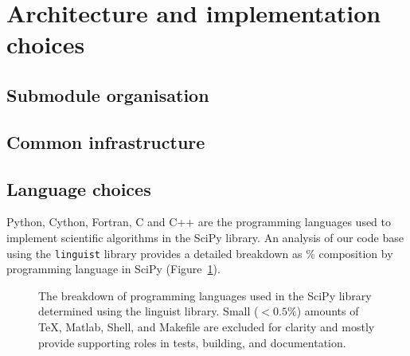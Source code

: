 \documentclass[fleqn,10pt]{wlscirep}
\begin{document}
\section*{Architecture and implementation choices}

\subsection*{Submodule organisation}


\subsection*{Common infrastructure}

\subsection*{Language choices}
Python, Cython, Fortran, C and C++ are the programming languages
used to implement scientific algorithms in the SciPy library. An analysis
of our code base using the \texttt{linguist} library provides a detailed
breakdown as \% composition by programming language in SciPy
(Figure~\ref{fig:linguist}).

    \begin{figure}[H]
        \centering

        \caption{The breakdown of programming languages used in the
	         SciPy library determined using the linguist library.
		 Small ($<0.5 \%$) amounts of TeX, Matlab, Shell,
		 and Makefile are excluded for clarity and mostly
		 provide supporting roles in tests, building, and
		 documentation.}
        \label{fig:linguist}
    \end{figure}
\end{document}
